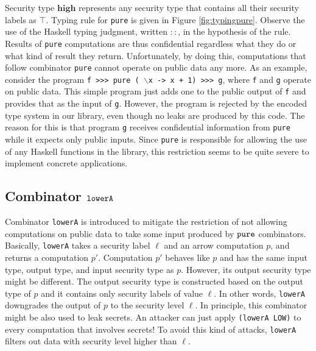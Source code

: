 \documentclass[times, 10pt,twocolumn]{article}
\begin{document}
Security type $\mathbf{high}$ represents any security
type that contains all their security labels as $\top$. 
Typing rule for \texttt{pure} is given in Figure
\ref{fig:typingpure}. Observe the use of the Haskell 
typing judgment, written $::$, in the hypothesis of the rule. 
Results of \texttt{pure} computations are
thus confidential regardless
what they do or what kind of result they return.
Unfortunately,  by doing this, computations that  
follow combinator \texttt{pure} cannot operate on 
public data any more. As an example, consider the 
program 
\texttt{f >>> pure ( $\backslash$x -> x + 1) >>> g},
where \texttt{f} and \texttt{g} 
operate on public data. This simple program just adds one to the
public output of \texttt{f} and provides that as the input of \texttt{g}. However, 
the program is rejected by the encoded type system in our library, even
though no leaks are produced by this code. 
The reason for this is that program \texttt{g} receives confidential information
from \texttt{pure} while it expects only public inputs. 
Since \texttt{pure} is responsible for
allowing the use of any Haskell functions in the library, this restriction seems to be quite 
severe to implement concrete applications. 

\subsection{Combinator $\mathtt{lowerA}$} \label{sec:lowerA}
Combinator \texttt{lowerA} is introduced to mitigate the restriction 
of not allowing computations on public data to take some input
produced by $\mathtt{pure}$ combinators. Basically, \texttt{lowerA}
takes a security label $\ell$ and an arrow computation $p$, 
and returns a computation $p'$. Computation $p'$ behaves 
like $p$ and has the 
same input type, output type, and input security type as $p$. However, 
its output security type might be different. The output security 
type is constructed based on the output type of $p$ and it 
contains only security labels of value $\ell$. 
In other words, \texttt{lowerA} downgrades the output of $p$ 
to the security level $\ell$. In principle, this combinator 
might be also used to leak secrets. 
An attacker can just apply \texttt{(lowerA LOW)} to every computation 
that involves secrets! To avoid this kind of attacks, 
\texttt{lowerA} filters out data with
security level higher than $\ell$. 
\end{document}
